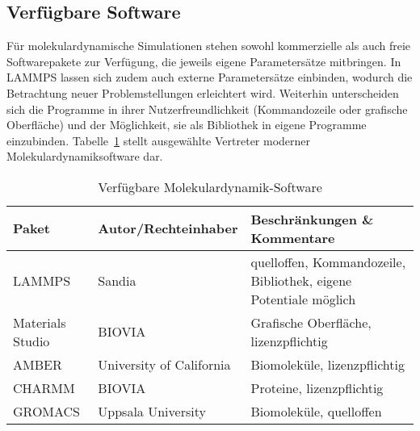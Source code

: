 \subsection{Verfügbare Software}

Für molekulardynamische Simulationen stehen sowohl kommerzielle als auch freie Softwarepakete zur Verfügung, die jeweils eigene Parametersätze mitbringen.
In LAMMPS lassen sich zudem auch externe Parametersätze einbinden, wodurch die Betrachtung neuer Problemstellungen erleichtert wird.
Weiterhin unterscheiden sich die Programme in ihrer Nutzerfreundlichkeit (Kommandozeile oder grafische Oberfläche) und der Möglichkeit, sie als Bibliothek in eigene Programme einzubinden.
Tabelle~\ref{tab:mdsoftware} stellt ausgewählte Vertreter moderner Molekulardynamiksoftware dar.

\begin{table}[hb]
  \oddrowcolors
  \caption[Verfügbare Molekulardynamik-Software]{
    Verfügbare Molekulardynamik-Software
  }
  \label{tab:mdsoftware}
  \begin{tabularx}{\textwidth}{|llX|}
    \hline
    \textbf{Paket}                                                               & \textbf{Autor/Rechteinhaber}   & \textbf{Beschränkungen \& Kommentare}                            \\
    \hline
    LAMMPS\cite{plimpton_lammps_2014,plimpton_fast_1995}                         & Sandia                   & quelloffen, Kommandozeile, Bibliothek, eigene Potentiale möglich \\
    Materials Studio\cite{biovia_materials_2014}                                 & BIOVIA                   & Grafische Oberfläche, lizenzpflichtig                            \\
    AMBER\cite{case_amber_2014,case_amber_2005}                                  & University of California & Biomoleküle, lizenzpflichtig                                     \\
    CHARMM\cite{brooks_charmm_2014,brooks_charmm:_1983,brooks_charmm:_2009}      & BIOVIA                   & Proteine, lizenzpflichtig                                        \\
    GROMACS\cite{lindahl_gromacs_2014,berendsen_gromacs:_1995,hess_gromacs_2008} & Uppsala University       & Biomoleküle, quelloffen                                          \\
    \hline
  \end{tabularx}
\end{table}
